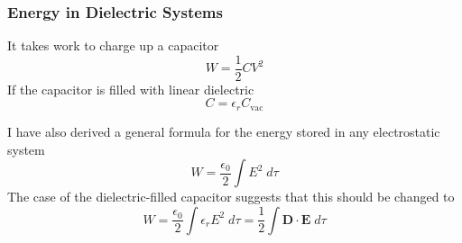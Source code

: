 \documentclass[../../../main.tex]{subfiles}
\begin{document}
\subsubsection*{Energy in Dielectric Systems}
It takes work to charge up a capacitor 
\begin{equation*}
    W=\frac{1}{2}CV^2
\end{equation*}
If the capacitor is filled with linear dielectric
\begin{equation*}
    C=\epsilon_rC_{\text{vac}}
\end{equation*}

I have also derived a general formula for the energy stored in any electrostatic system
\begin{equation*}
    W=\frac{\epsilon_0}{2}\int E^2\;d\tau
\end{equation*}
The case of the dielectric-filled capacitor suggests that this should be changed to
\begin{equation*}
    W=\frac{\epsilon_0}{2}\int \epsilon_rE^2\;d\tau=\frac{1}{2} \int\mathbf{D}\cdot\mathbf{E}\;d\tau
\end{equation*}
\end{document}
